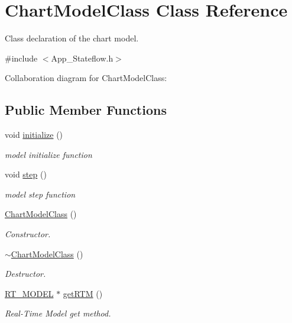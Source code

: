 \hypertarget{class_chart_model_class}{}\section{Chart\+Model\+Class Class Reference}
\label{class_chart_model_class}


Class declaration of the chart model.  




{\ttfamily \#include $<$App\+\_\+\+Stateflow.\+h$>$}



Collaboration diagram for Chart\+Model\+Class\+:
\subsection*{Public Member Functions}
\begin{DoxyCompactItemize}
\item 
void \mbox{\hyperlink{class_chart_model_class_ab32e055f4e5692dd69685b4befbea75d}{initialize}} ()
\begin{DoxyCompactList}\small\item\em model initialize function \end{DoxyCompactList}\item 
void \mbox{\hyperlink{class_chart_model_class_ab729e721b38bcedeed5b39c2de387413}{step}} ()
\begin{DoxyCompactList}\small\item\em model step function \end{DoxyCompactList}\item 
\mbox{\hyperlink{class_chart_model_class_ac943318da1975acdd0bee749a1372c47}{Chart\+Model\+Class}} ()
\begin{DoxyCompactList}\small\item\em Constructor. \end{DoxyCompactList}\item 
\mbox{\hyperlink{class_chart_model_class_a7b8440da4a5cbe07a6b0433db9a69f99}{$\sim$\+Chart\+Model\+Class}} ()
\begin{DoxyCompactList}\small\item\em Destructor. \end{DoxyCompactList}\item 
\mbox{\hyperlink{_app___stateflow_8h_a6f32dbbab0d15102b3fe6ec3fe6a72ba}{R\+T\+\_\+\+M\+O\+D\+EL}} $\ast$ \mbox{\hyperlink{class_chart_model_class_a77ef9eda8f1e119f93ad3c87b3a54bbd}{get\+R\+TM}} ()
\begin{DoxyCompactList}\small\item\em Real-\/\+Time Model get method. \end{DoxyCompactList}\end{DoxyCompactItemize}
